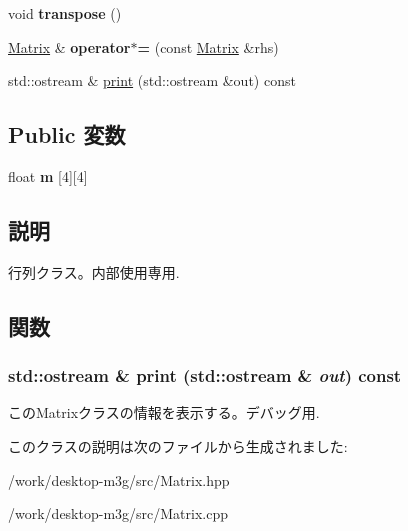 \begin{CompactItemize}
\item 
\hypertarget{classm3g_1_1Matrix_f3a99ffb20127be48232d12260e934dc}{
void \textbf{transpose} ()}
\label{classm3g_1_1Matrix_f3a99ffb20127be48232d12260e934dc}

\item 
\hypertarget{classm3g_1_1Matrix_5d28596666a27f88d74bacceaef9b326}{
\hyperlink{classm3g_1_1Matrix}{Matrix} \& \textbf{operator$\ast$=} (const \hyperlink{classm3g_1_1Matrix}{Matrix} \&rhs)}
\label{classm3g_1_1Matrix_5d28596666a27f88d74bacceaef9b326}

\item 
std::ostream \& \hyperlink{classm3g_1_1Matrix_6fea17fa1532df3794f8cb39cb4f911f}{print} (std::ostream \&out) const 
\end{CompactItemize}
\subsection*{Public 変数}
\begin{CompactItemize}
\item 
\hypertarget{classm3g_1_1Matrix_7cdab8754cd800b1ba4008e559aa314c}{
float \textbf{m} \mbox{[}4\mbox{]}\mbox{[}4\mbox{]}}
\label{classm3g_1_1Matrix_7cdab8754cd800b1ba4008e559aa314c}

\end{CompactItemize}


\subsection{説明}
行列クラス。内部使用専用. 

\subsection{関数}
\hypertarget{classm3g_1_1Matrix_6fea17fa1532df3794f8cb39cb4f911f}{
\subsubsection[{print}]{\setlength{\rightskip}{0pt plus 5cm}std::ostream \& print (std::ostream \& {\em out}) const}}
\label{classm3g_1_1Matrix_6fea17fa1532df3794f8cb39cb4f911f}


このMatrixクラスの情報を表示する。デバッグ用. 

このクラスの説明は次のファイルから生成されました:\begin{CompactItemize}
\item 
/work/desktop-m3g/src/Matrix.hpp\item 
/work/desktop-m3g/src/Matrix.cpp\end{CompactItemize}
